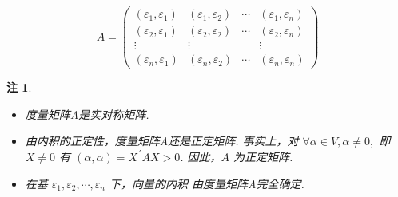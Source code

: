 \documentclass[13pt]{beamer}
\newtheorem*{rem}{注}
\begin{document}
\begin{frame}{}

$$A=
\left(\begin{array}{cccc}
\left(\varepsilon_{1}, \varepsilon_{1}\right) & \left(\varepsilon_{1}, \varepsilon_{2}\right) & \cdots & \left(\varepsilon_{1}, \varepsilon_{n}\right) \\ 
\left(\varepsilon_{2}, \varepsilon_{1}\right) & \left(\varepsilon_{2}, \varepsilon_{2}\right) & \cdots & \left(\varepsilon_{2}, \varepsilon_{n}\right) \\
\vdots & \vdots &  & \vdots \\ 
 \left(\varepsilon_{n}, \varepsilon_{1}\right)  & \left(\varepsilon_{n}, \varepsilon_{2}\right) & \cdots & \left(\varepsilon_{n}, \varepsilon_{n}\right)
\end{array}\right)$$

\begin{rem}
	\begin{itemize}
		\item 度量矩阵A是实对称矩阵.
		\item 由内积的正定性，度量矩阵A还是正定矩阵.
		事实上，对 $\forall \alpha \in V, \alpha \neq {0},$ 即 $X \neq 0$
		有 $(\alpha, \alpha)=X^{\, \prime} A X>0$.
		因此，$ A$ 为正定矩阵.
		\item 在基 $\varepsilon_{1}, \varepsilon_{2}, \cdots, \varepsilon_{n}$ 下，向量的内积
		由度量矩阵A完全确定.
	\end{itemize}
\end{rem}

\end{frame}
\end{document}
